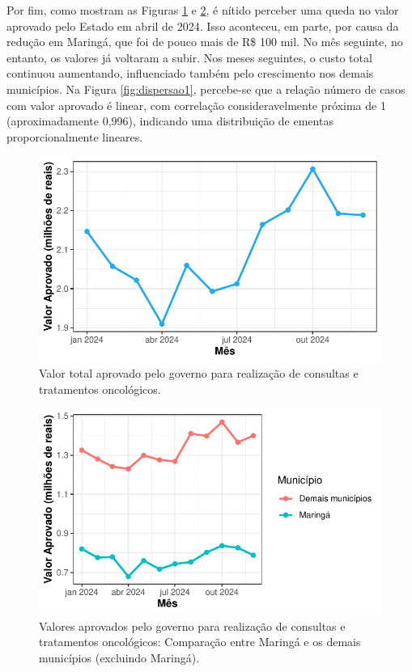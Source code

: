 \documentclass[a4paper]{modeloLEA} %
\begin{document}
\newpage

Por fim, como mostram as Figuras \ref{fig:custo} e \ref{fig:custo2}, é nítido perceber uma queda no valor aprovado pelo Estado em abril de 2024. Isso aconteceu, em parte, por causa da redução em Maringá, que foi de pouco mais de R\$ 100 mil. No mês seguinte, no entanto, os valores já voltaram a subir. Nos meses seguintes, o custo total continuou aumentando, influenciado também pelo crescimento nos demais municípios. Na Figura \ref{fig:dispersao1}, percebe-se que a relação número de casos com valor aprovado é linear, com correlação consideravelmente próxima de 1 (aproximadamente 0,996), indicando uma distribuição de ementas proporcionalmente lineares.

\begin{figure}[h]

{\centering \includegraphics{relatorio_files/figure-latex/custo-1} 

}

\caption{\label{fig:custo}Valor total aprovado pelo governo para realização de consultas e tratamentos oncológicos.}\label{fig:custo}
\end{figure}

\begin{figure}[h]

{\centering \includegraphics{relatorio_files/figure-latex/custo2-1} 

}

\caption{\label{fig:custo2}Valores aprovados pelo governo para realização de consultas e tratamentos oncológicos: Comparação entre Maringá e os demais municípios (excluindo Maringá).}\label{fig:custo2}
\end{figure}
\end{document}
